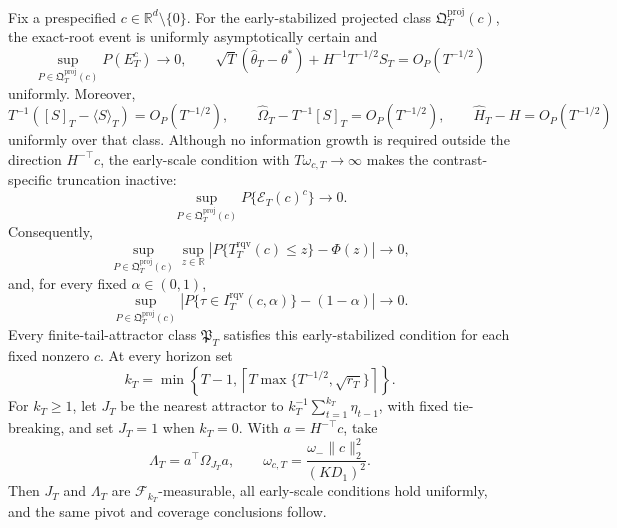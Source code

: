 Fix a prespecified \(c\in\mathbb R^d\setminus\{0\}\). For the early-stabilized projected class \(\mathfrak Q_T^{\mathrm{proj}}(c)\), the exact-root event is uniformly asymptotically certain and
\[
 \sup_{P\in\mathfrak Q_T^{\mathrm{proj}}(c)}P(E_T^c)\longrightarrow0,
 \qquad
 \sqrt T(\widehat\theta_T-\theta^*)+H^{-1}T^{-1/2}S_T
 =O_P(T^{-1/2})
\]
uniformly. Moreover,
\[
 T^{-1}([S]_T-\langle S\rangle_T)=O_P(T^{-1/2}),\qquad
 \widehat\Omega_T-T^{-1}[S]_T=O_P(T^{-1/2}),\qquad
 \widehat H_T-H=O_P(T^{-1/2})
\]
uniformly over that class. Although no information growth is required outside the direction \(H^{-\top}c\), the early-scale condition with \(T\omega_{c,T}\to\infty\) makes the contrast-specific truncation inactive:
\[
 \sup_{P\in\mathfrak Q_T^{\mathrm{proj}}(c)}P\{\mathcal E_T(c)^c\}
 \longrightarrow0.
\]
Consequently,
\[
 \sup_{P\in\mathfrak Q_T^{\mathrm{proj}}(c)}\sup_{z\in\mathbb R}
 \left|P\{T_T^{\mathrm{rqv}}(c)\le z\}-\Phi(z)\right|
 \longrightarrow0,
\]
and, for every fixed \(\alpha\in(0,1)\),
\[
 \sup_{P\in\mathfrak Q_T^{\mathrm{proj}}(c)}
 \left|P\{\tau\in I_T^{\mathrm{rqv}}(c,\alpha)\}-(1-\alpha)\right|
 \longrightarrow0.
\]
Every finite-tail-attractor class \(\mathfrak P_T\) satisfies this early-stabilized condition for each fixed nonzero \(c\). At every horizon set
\[
 k_T=\min\!\left\{T-1,\left\lceil T\max\{T^{-1/2},\sqrt{r_T}\}\right\rceil\right\}.
\]
For \(k_T\ge1\), let \(J_T\) be the nearest attractor to \(k_T^{-1}\sum_{t=1}^{k_T}\eta_{t-1}\), with fixed tie-breaking, and set \(J_T=1\) when \(k_T=0\). With \(a=H^{-\top}c\), take
\[
 \Lambda_T=a^\top\Omega_{J_T}a,\qquad
 \omega_{c,T}=\frac{\omega_-\|c\|_2^2}{(KD_1)^2}.
\]
Then \(J_T\) and \(\Lambda_T\) are \(\mathcal F_{k_T}\)-measurable, all early-scale conditions hold uniformly, and the same pivot and coverage conclusions follow.
